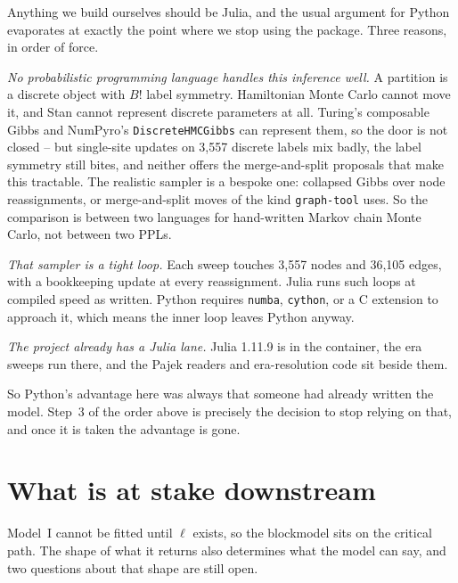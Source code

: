 \documentclass[11pt]{article}
\newcommand{\code}[1]{\texttt{\small #1}}
\begin{document}
Anything we build ourselves should be Julia, and the usual argument for Python
evaporates at exactly the point where we stop using the package. Three reasons,
in order of force.

\emph{No probabilistic programming language handles this inference well.} A
partition is a discrete object with $B!$ label symmetry. Hamiltonian Monte
Carlo cannot move it, and Stan cannot represent discrete parameters at all.
Turing's composable Gibbs and NumPyro's \code{DiscreteHMCGibbs} can represent
them, so the door is not closed -- but single-site updates on 3{,}557 discrete
labels mix badly, the label symmetry still bites, and neither offers the
merge-and-split proposals that make this tractable. The realistic sampler is a
bespoke one: collapsed Gibbs over node reassignments, or merge-and-split moves
of the kind \code{graph-tool} uses. So the comparison is between two languages
for hand-written Markov chain Monte Carlo, not between two PPLs.

\emph{That sampler is a tight loop.} Each sweep touches 3{,}557 nodes and
36{,}105 edges, with a bookkeeping update at every reassignment. Julia runs
such loops at compiled speed as written. Python requires \code{numba},
\code{cython}, or a C extension to approach it, which means the inner loop
leaves Python anyway.

\emph{The project already has a Julia lane.} Julia 1.11.9 is in the container,
the era sweeps run there, and the Pajek readers and era-resolution code sit
beside them.

So Python's advantage here was always that someone had already written the
model. Step~3 of the order above is precisely the decision to stop relying on
that, and once it is taken the advantage is gone.

\section{What is at stake downstream}
\label{sec:downstream}

Model~I cannot be fitted until $\ell$ exists, so the blockmodel sits on the
critical path. The shape of what it returns also determines what the model can
say, and two questions about that shape are still open.
\end{document}
